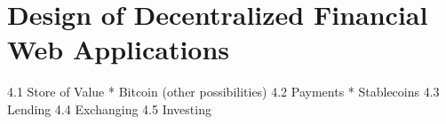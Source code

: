 \chapter{Design of Decentralized Financial Web Applications}
\label{cha:DesignDecentralizedFinancialWebApplications}

 4.1 Store of Value
* Bitcoin
(other possibilities)
4.2 Payments
* Stablecoins
4.3 Lending
4.4 Exchanging
4.5 Investing